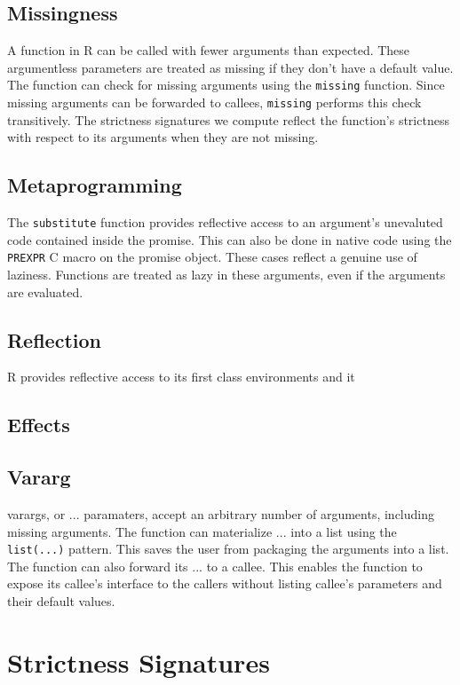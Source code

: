 \documentclass[review,nonacm,screen,acmsmall,anonymous=true]{acmart}
\newcommand{\code}[1]{\lstinline[style=R]|#1|\xspace}
\begin{document}
\subsection{Missingness}

A function in R can be called with fewer arguments than expected. These
argumentless parameters are treated as missing if they don't have a default
value. The function can check for missing arguments using the \code{missing}
function. Since missing arguments can be forwarded to callees, \code{missing}
performs this check transitively. The strictness signatures we compute reflect
the function's strictness with respect to its arguments when they are not
missing.


\subsection{Metaprogramming}
The \code{substitute} function provides reflective access to an argument's
unevaluted code contained inside the promise. This can also be done in native
code using the \code{PREXPR} C macro on the promise object. These cases reflect a
genuine use of laziness. Functions are treated as lazy in these arguments, even
if the arguments are evaluated.

\subsection{Reflection}
R provides reflective access to its first class environments and it

\subsection{Effects}

\subsection{Vararg}
varargs, or $...$ paramaters, accept an arbitrary number of arguments, including
missing arguments. The function can materialize $...$ into a list using the
\code{list(...)} pattern. This saves the user from packaging the arguments into
a list. The function can also forward its $...$ to a callee. This enables the
function to expose its callee's interface to the callers without listing
callee's parameters and their default values.


\section{Strictness Signatures}
\end{document}
